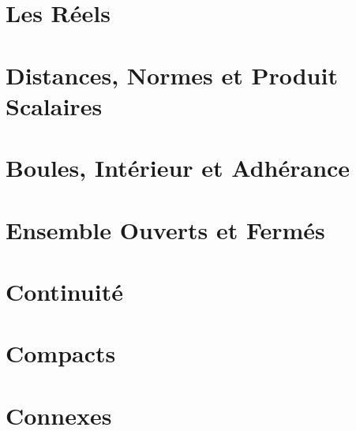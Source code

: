 



\chapter{Les Réels}


\chapter{Distances, Normes et Produit Scalaires}


\chapter{Boules, Intérieur et Adhérance}


\chapter{Ensemble Ouverts et Fermés}


\chapter{Continuité}


\chapter{Compacts}


\chapter{Connexes}


% 
